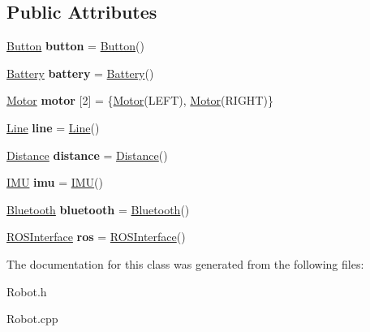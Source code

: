\subsection*{Public Attributes}
\begin{DoxyCompactItemize}
\item 
\mbox{\label{class_robot_a0a3781e332a541552c93d712f9b3c617}} 
\hyperlink{class_button}{Button} {\bfseries button} = \hyperlink{class_button}{Button}()
\item 
\mbox{\label{class_robot_a44073d258597157379e95c8b98abca1e}} 
\hyperlink{class_battery}{Battery} {\bfseries battery} = \hyperlink{class_battery}{Battery}()
\item 
\mbox{\label{class_robot_a7179be791f542a63d48fb2e97bf8eebb}} 
\hyperlink{class_motor}{Motor} {\bfseries motor} \mbox{[}2\mbox{]} = \{\hyperlink{class_motor}{Motor}(L\+E\+FT), \hyperlink{class_motor}{Motor}(R\+I\+G\+HT)\}
\item 
\mbox{\label{class_robot_a693a004e58b023861750205acf5d1f87}} 
\hyperlink{class_line}{Line} {\bfseries line} = \hyperlink{class_line}{Line}()
\item 
\mbox{\label{class_robot_ae272272bc61f3191facdde0d8fa917b0}} 
\hyperlink{class_distance}{Distance} {\bfseries distance} = \hyperlink{class_distance}{Distance}()
\item 
\mbox{\label{class_robot_aaccc886d8f992b77c77bad0bf0b87cc4}} 
\hyperlink{class_i_m_u}{I\+MU} {\bfseries imu} = \hyperlink{class_i_m_u}{I\+MU}()
\item 
\mbox{\label{class_robot_ad475912c97d313312ed3b3f5a27cdbbb}} 
\hyperlink{class_bluetooth}{Bluetooth} {\bfseries bluetooth} = \hyperlink{class_bluetooth}{Bluetooth}()
\item 
\mbox{\label{class_robot_a6b65e02af58293548ad020cc121b5dab}} 
\hyperlink{class_r_o_s_interface}{R\+O\+S\+Interface} {\bfseries ros} = \hyperlink{class_r_o_s_interface}{R\+O\+S\+Interface}()
\end{DoxyCompactItemize}


The documentation for this class was generated from the following files\+:\begin{DoxyCompactItemize}
\item 
Robot.\+h\item 
Robot.\+cpp\end{DoxyCompactItemize}

